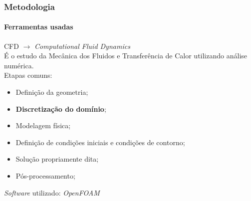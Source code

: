 \documentclass[svgnames,smaller,table]{beamer}
\begin{document}
%
%
%  
\begin{frame}
  \frametitle{Metodologia}
  \framesubtitle{Ferramentas usadas}
  CFD $\rightarrow$ \textit{Computational Fluid Dynamics}
  \\
  \vspace{0.5cm}
  É o estudo da Mecânica dos Fluidos e Transferência de Calor utilizando análise numérica.
  \\
  \vspace{0.5cm}
  Etapas comuns:
  \begin{itemize}
  \item Definição da geometria;
  \item \textbf{Discretização do domínio};
  \item Modelagem física;
  \item Definição de condições iniciais e condições de contorno;
  \item Solução propriamente dita;
  \item Pós-processamento;
  \end{itemize}
  \centering
  \vspace{0.5cm}
  \textit{Software} utilizado: \textit{OpenFOAM}
\end{frame}
\end{document}
